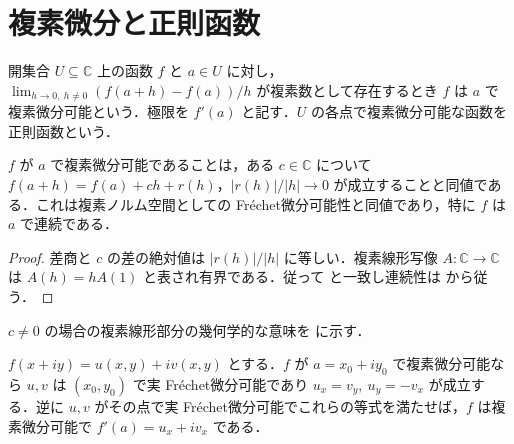 \section{複素微分と正則函数}
\begin{defn}[複素微分と正則函数]
開集合 $U\subseteq\mathbb C$ 上の函数 $f$ と $a\in U$ に対し，$\lim_{h\to0,\ h\ne0}(f(a+h)-f(a))/h$ が複素数として存在するとき $f$ は $a$ で複素微分可能という．極限を $f'(a)$ と記す．$U$ の各点で複素微分可能な函数を正則函数という．
\end{defn}
\begin{prop}[複素微分と線形近似]
$f$ が $a$ で複素微分可能であることは，ある $c\in\mathbb C$ について $f(a+h)=f(a)+ch+r(h)$，$|r(h)|/|h|\to0$ が成立することと同値である．これは複素ノルム空間としての Fréchet微分可能性と同値であり，特に $f$ は $a$ で連続である．
\end{prop}
\begin{proof}
差商と $c$ の差の絶対値は $|r(h)|/|h|$ に等しい．複素線形写像 $A:\mathbb C\to\mathbb C$ は $A(h)=hA(1)$ と表され有界である．従って  と一致し連続性は  から従う．
\end{proof}
$c\ne0$ の場合の複素線形部分の幾何学的な意味を  に示す．
\begin{prop}
$f(x+iy)=u(x,y)+iv(x,y)$ とする．$f$ が $a=x_0+iy_0$ で複素微分可能なら $u,v$ は $(x_0,y_0)$ で実 Fréchet微分可能であり $u_x=v_y,\ u_y=-v_x$ が成立する．逆に $u,v$ がその点で実 Fréchet微分可能でこれらの等式を満たせば，$f$ は複素微分可能で $f'(a)=u_x+iv_x$ である．
\end{prop}
